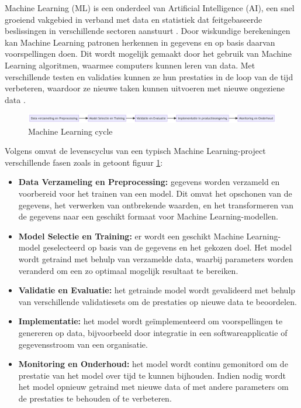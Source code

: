 Machine Learning (ML) is een onderdeel van Artificial Intelligence (AI), een snel groeiend vakgebied in verband met data en statistiek dat feitgebaseerde beslissingen in verschillende sectoren aanstuurt \autocite{Jordan2015}. Door wiskundige berekeningen kan Machine Learning patronen herkennen in gegevens en op basis daarvan voorspellingen doen. Dit wordt mogelijk gemaakt door het gebruik van Machine Learning algoritmen, waarmee computers kunnen leren van data. Met verschillende testen en validaties kunnen ze hun prestaties in de loop van de tijd verbeteren, waardoor ze nieuwe taken kunnen uitvoeren met nieuwe ongeziene data \autocite{Shaveta2023}.\newline

\begin{figure}[h]
    \includegraphics[width=\linewidth]{graphics/mlcycle.png}
    \caption{Machine Learning cycle}
    \label{fig:ML_cycle}
\end{figure}

Volgens \textcite{Schlegel2022} omvat de levenscyclus van een typisch Machine Learning-project verschillende fasen zoals in getoont figuur \ref{fig:ML_cycle}:

\begin{itemize}
    \item \textbf{Data Verzameling en Preprocessing:} gegevens worden verzameld en voorbereid voor het trainen van een model. Dit omvat het opschonen van de gegevens, het verwerken van ontbrekende waarden, en het transformeren van de gegevens naar een geschikt formaat voor Machine Learning-modellen.

    \item \textbf{Model Selectie en Training:} er wordt een geschikt Machine Learning-model geselecteerd op basis van de gegevens en het gekozen doel. Het model wordt getraind met behulp van verzamelde data, waarbij parameters worden veranderd om een zo optimaal mogelijk resultaat te bereiken.
    
    \item \textbf{Validatie en Evaluatie:} het getrainde model wordt gevalideerd met behulp van verschillende validatiesets om de prestaties op nieuwe data te beoordelen.
    
    \item \textbf{Implementatie:} het model wordt geïmplementeerd om voorspellingen te genereren op data, bijvoorbeeld door integratie in een softwareapplicatie of gegevensstroom van een organisatie.

    \item \textbf{Monitoring en Onderhoud:} het model wordt continu gemonitord om de prestatie van het model over tijd te kunnen bijhouden. Indien nodig wordt het model opnieuw getraind met nieuwe data of met andere parameters om de prestaties te behouden of te verbeteren.
\end{itemize}

